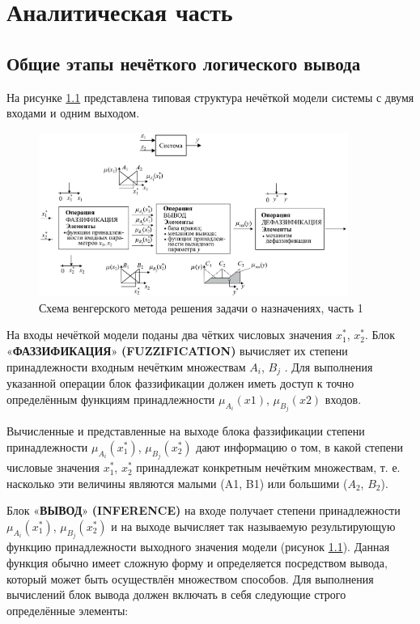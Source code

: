 \chapter{Аналитическая часть}

\section{Общие этапы нечёткого логического вывода}

На рисунке \ref{img:algo} представлена типовая структура нечёткой модели системы
с двумя входами и одним выходом.~\cite{book}

\begin{figure}
	\begin{center}
		\includegraphics[width=0.9\textwidth]{images/algo.png}
	\end{center}
	\caption{Схема венгерского метода решения задачи о назначениях, часть 1}
	\label{img:algo}
\end{figure}

На входы нечёткой модели поданы два чётких числовых значения $x^*_1$, $x^*_2$. Блок «\textbf{ФАЗЗИФИКАЦИЯ}» \textbf{(FUZZIFICATION)} вычисляет их
степени принадлежности входным нечётким множествам $A_i$, $B_j$ . Для выполнения указанной операции блок фаззификации должен иметь доступ
к точно определённым функциям принадлежности $\mu_{A_i}(x1)$, $\mu_{B_j}(x2)$ входов.~\cite{book}

Вычисленные и представленные на выходе блока фаззификации степени принадлежности $\mu_{A_i}(x_1^*)$, $\mu_{B_j}(x_2^*)$ дают информацию о том, в какой
степени числовые значения $x^*_1$, $x^*_2$ принадлежат конкретным нечётким
множествам, т. е. насколько эти величины являются малыми (A1, B1)
или большими ($A_2$, $B_2$).~\cite{book}

Блок «\textbf{ВЫВОД}» \textbf{(INFERENCE)} на входе получает степени принадлежности $\mu_{A_i}(x_1^*)$, $\mu_{B_j}(x_2^*)$ и на выходе вычисляет так называемую
результирующую функцию принадлежности выходного значения модели
(рисунок \ref{img:algo}). Данная функция обычно имеет сложную форму и определяется
посредством вывода, который может быть осуществлён множеством способов. Для выполнения вычислений блок вывода должен включать в себя
следующие строго определённые элементы:~\cite{book}

